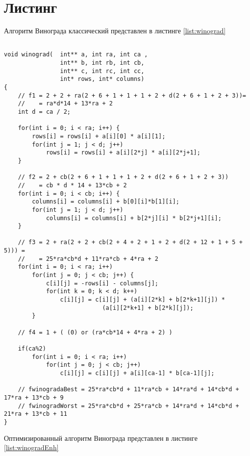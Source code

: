 \section{ Листинг}
Алгоритм Винограда классический представлен в листинге \ref{list:winograd}
\begin{lstlisting}[style=CStyle, caption={Winograd algorithm},
                    label={list:winograd}]

void winograd(  int** a, int ra, int ca , 
                int** b, int rb, int cb, 
                int** c, int rc, int cc,
                int* rows, int* columns)
{
    // f1 = 2 + 2 + ra(2 + 6 + 1 + 1 + 1 + 2 + d(2 + 6 + 1 + 2 + 3))=
    //    = ra*d*14 + 13*ra + 2
    int d = ca / 2;

    for(int i = 0; i < ra; i++) {
        rows[i] = rows[i] + a[i][0] * a[i][1];
        for(int j = 1; j < d; j++)
            rows[i] = rows[i] + a[i][2*j] * a[i][2*j+1];
    }

    // f2 = 2 + cb(2 + 6 + 1 + 1 + 1 + 2 + d(2 + 6 + 1 + 2 + 3))
    //    = cb * d * 14 + 13*cb + 2
    for(int i = 0; i < cb; i++) {
        columns[i] = columns[i] + b[0][i]*b[1][i];
        for(int j = 1; j < d; j++)
            columns[i] = columns[i] + b[2*j][i] * b[2*j+1][i];
    }

    // f3 = 2 + ra(2 + 2 + cb(2 + 4 + 2 + 1 + 2 + d(2 + 12 + 1 + 5 + 5))) =
    //    = 25*ra*cb*d + 11*ra*cb + 4*ra + 2
    for(int i = 0; i < ra; i++)
        for(int j = 0; j < cb; j++) {
            c[i][j] = -rows[i] - columns[j];
            for(int k = 0; k < d; k++)
                c[i][j] = c[i][j] + (a[i][2*k] + b[2*k+1][j]) * 
                            (a[i][2*k+1] + b[2*k][j]);
        }

    // f4 = 1 + ( (0) or (ra*cb*14 + 4*ra + 2) )

    if(ca%2)
        for(int i = 0; i < ra; i++)
            for(int j = 0; j < cb; j++)
                c[i][j] = c[i][j] + a[i][ca-1] * b[ca-1][j];

    // fwinogradaBest = 25*ra*cb*d + 11*ra*cb + 14*ra*d + 14*cb*d + 17*ra + 13*cb + 9
    // fwinogradWorst = 25*ra*cb*d + 25*ra*cb + 14*ra*d + 14*cb*d + 21*ra + 13*cb + 11
}
\end{lstlisting}

Оптимизированный алгоритм Винограда представлен в листинге \ref{list:winogradEnh}

